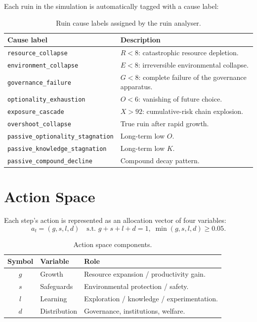 Each ruin in the simulation is automatically tagged with a cause
label:

\begin{table}[ht]
\centering
\small
\begin{tabularx}{\linewidth}{lX}
\toprule
\textbf{Cause label} & \textbf{Description} \\
\midrule
\texttt{resource\_collapse} & $R < 8$: catastrophic resource
depletion. \\
\texttt{environment\_collapse} & $E < 8$: irreversible environmental
collapse. \\
\texttt{governance\_failure} & $G < 8$: complete failure of the
governance apparatus. \\
\texttt{optionality\_exhaustion} & $O < 6$: vanishing of future
choice. \\
\texttt{exposure\_cascade} & $X > 92$: cumulative-risk chain
explosion. \\
\texttt{overshoot\_collapse} & True ruin after rapid growth. \\
\texttt{passive\_optionality\_stagnation} & Long-term low $O$. \\
\texttt{passive\_knowledge\_stagnation} & Long-term low $K$. \\
\texttt{passive\_compound\_decline} & Compound decay pattern. \\
\bottomrule
\end{tabularx}
\caption[Ruin cause labels]{Ruin cause labels assigned by the ruin
analyser.}
\label{tab:vnext-ruin-causes}
\end{table}

\section{Action Space}
\label{sec:vnext-action-space}

\begin{definition}
\label{def:vnext-action-vector}
Each step's action is represented as an allocation vector of four
variables:
\begin{equation}
a_t = (g, s, l, d) \quad
\text{s.t.~} g + s + l + d = 1,\;
\min(g, s, l, d) \ge 0.05.
\end{equation}
\end{definition}

\begin{table}[ht]
\centering
\small
\begin{tabularx}{\linewidth}{cXX}
\toprule
\textbf{Symbol} & \textbf{Variable} & \textbf{Role} \\
\midrule
$g$ & Growth & Resource expansion / productivity gain. \\
$s$ & Safeguards & Environmental protection / safety. \\
$l$ & Learning & Exploration / knowledge / experimentation. \\
$d$ & Distribution & Governance, institutions, welfare. \\
\bottomrule
\end{tabularx}
\caption[Action space components]{Action space components.}
\label{tab:vnext-action-space}
\end{table}

